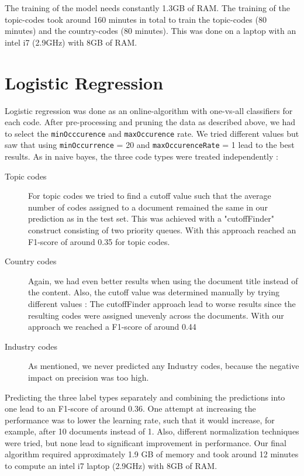 \documentclass{article}
\begin{document}
The training of the model needs constantly 1.3GB of RAM. The training of the topic-codes took around 160 minutes in total to train the topic-codes (80 minutes) and the country-codes (80 minutes). This was done on a laptop with an intel i7 (2.9GHz) with 8GB of RAM.


\vspace{-2mm}
\section*{Logistic Regression}
    Logistic regression was done as an online-algorithm with one-vs-all classifiers for each code. After pre-processing and pruning the data as described above, we had to select the \texttt{minOcccurence} and \texttt{maxOccurence} rate. We tried different values but saw that using \texttt{minOccurrence} = 20 and \texttt{maxOccurenceRate} = 1 lead to the best results.
    As in naive bayes, the three code types were treated independently :
    \begin{description}
    \item[Topic codes] For topic codes we tried to find a cutoff value such that the average number of codes assigned to a document remained the same in our prediction as in the test set. This was achieved with a "cutoffFinder" construct consisting of two priority queues. With this approach reached an F1-score of around 0.35 for topic codes.
    \item[Country codes] Again,  we had even better results when using the document title instead of the content. Also, the cutoff value was determined manually by trying different values : The cutoffFinder approach lead to worse results since the resulting codes were assigned unevenly across the documents. With our approach we reached a F1-score of around 0.44
    \item[Industry codes] As mentioned, we never predicted any Industry codes, because the negative impact on precision was too high.
    \end{description}

    Predicting the three label types separately and combining the predictions into one lead to an F1-score of around 0.36. One attempt at increasing the performance was to lower the learning rate, such that it would increase, for example, after 10 documents instead of 1. Also, different normalization techniques were tried, but none lead to significant improvement in performance. Our final algorithm required approximately 1.9 GB of memory and took around 12 minutes to compute an intel i7 laptop (2.9GHz) with 8GB of RAM.
\end{document}
